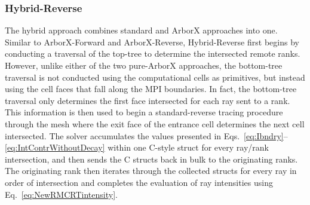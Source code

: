 \subsubsection{Hybrid-Reverse}
The hybrid approach combines standard and ArborX approaches into one. Similar to ArborX-Forward and ArborX-Reverse, Hybrid-Reverse first begins by conducting a traversal of the top-tree to determine the intersected remote ranks. However, unlike either of the two pure-ArborX approaches, the bottom-tree traversal is not conducted using the computational cells as primitives, but instead using the cell faces that fall along the MPI boundaries. 
In fact, the bottom-tree traversal only determines the first face intersected for each ray sent to a rank. This information is then used to begin a standard-reverse tracing procedure through the mesh where the exit face of the entrance cell determines the next cell intersected. The solver accumulates the values presented in Eqs.~\ref{eq:Ibndry}–\ref{eq:IntContrWithoutDecay} within one C-style struct for every ray/rank intersection, and then sends the C structs back in bulk to the originating ranks.
The originating rank then iterates through the collected structs for every ray in order of intersection and completes the evaluation of ray intensities using Eq.~\ref{eq:NewRMCRTintensity}.




